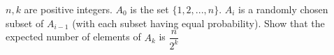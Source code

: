 $n, k$ are positive integers. $A_0$ is the set $\{1, 2, ... , n\}$. $A_i$ is a randomly chosen subset of $A_{i-1}$ (with each subset having equal probability). Show that the expected number of elements of $A_k$ is $\dfrac{n}{2^k}$